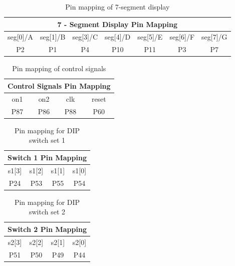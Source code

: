 \documentclass[11pt]{article}
\begin{document}
\begin{table}[h]
\centering
\begin{tabular}{|c|c|c|c|c|c|c|}
\hline
\multicolumn{7}{|c|}{\textbf{7 - Segment Display Pin Mapping}} \\ \hline
seg[0]/A   & seg[1]/B   & seg[3]/C   & seg[4]/D    & seg[5]/E    & seg[6]/F   & seg[7]/G   \\ \hline
P2         & P1         & P4         & P10         & P11         & P3         & P7  \\ \hline
\end{tabular}
\caption{Pin mapping of 7-segment display}
\label{table:pinmap_sevenseg}
\end{table}


\begin{table}[h]
\centering
\begin{tabular}{|c|c|c|c|}
\hline
\multicolumn{4}{|c|}{\textbf{Control Signals Pin Mapping}} \\ \hline
on1        & on2        & clk        & reset       \\ \hline
P87        & P86        & P88        & P60         \\ \hline
\end{tabular}
\caption{Pin mapping of control signals}
\label{table:pinmap_control}
\end{table}


\begin{table}[h]
\centering
\begin{tabular}{|c|c|c|c|}
\hline
\multicolumn{4}{|c|}{\textbf{Switch 1 Pin Mapping}} \\ \hline
s1{[}3{]}  & s1{[}2{]}  & s1{[}1{]} & s1{[}0{]} \\ \hline
P24        & P53        & P55       & P54       \\ \hline
\end{tabular}
\caption{Pin mapping for DIP switch set 1}
\label{table:pinmap_sw1}
\end{table}


\begin{table}[h]
\centering
\begin{tabular}{|c|c|c|c|}
\hline
\multicolumn{4}{|c|}{\textbf{Switch 2 Pin Mapping}} \\ \hline
s2{[}3{]}  & s2{[}2{]}  & s2{[}1{]} & s2{[}0{]} \\ \hline
P51        & P50        & P49       & P44       \\ \hline
\end{tabular}
\caption{Pin mapping for DIP switch set 2}
\label{table:pinmap_sw2}
\end{table}
\end{document}

